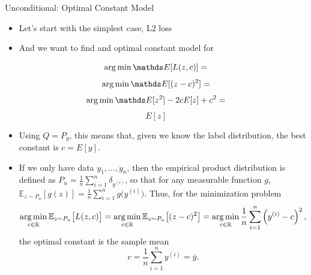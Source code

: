 \documentclass[11pt,compress,t,notes=noshow, xcolor=table]{beamer}
\begin{document}
\begin{vbframe}{Unconditional: Optimal Constant Model}

\begin{itemize}
\item Let's start with the simplest case, L2 loss
\item And we want to find and optimal constant model for 

\end{itemize}

$$ \argmin \E [L(z, c)] = $$
$$ \argmin \E [(z - c)^2] = $$
$$ \argmin \E [z^2] - 2cE[z] + c^2 = $$
$$ E[z] $$

\begin{itemize}
\item Using $Q = P_y$, this means that, given we know the label distribution,
the best constant is $c = E[y]$.
\item If we only have data \(y_1, \ldots, y_n\), then the empirical product distribution is defined as $P_n = \frac{1}{n}\sum_{i=1}^n \delta_{y^{(i)}}$, so that for any measurable function \(g\),
$\mathbb{E}_{z\sim P_n}[g(z)] = \frac{1}{n}\sum_{i=1}^n g\bigl(y^{(i)}\bigr).$
Thus, for the minimization problem
\[
 \operatorname*{arg\,min}_{c \in \mathbb{R}} \mathbb{E}_{z\sim P_n}\bigl[L(z,c)\bigr] = \operatorname*{arg\,min}_{c \in \mathbb{R}} \mathbb{E}_{z\sim P_n}\bigl[(z-c)^2\bigr] =  \operatorname*{arg\,min}_{c \in \mathbb{R}} \frac{1}{n}\sum_{i=1}^n \left(y^{(i)}-c\right)^2,
\]
the optimal constant is the sample mean
\[
c = \frac{1}{n}\sum_{i=1}^n y^{(i)} = \bar{y}.
\]


\end{itemize}


\end{vbframe}
\end{document}
